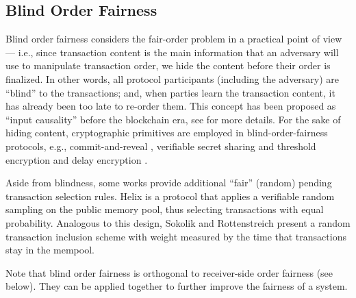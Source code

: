 \subsection{Blind Order Fairness}

Blind order fairness \cite{TOPLAS:ReiBir94,C:CKPS01,ICNP:ACGLRTY18,IWQOS:SokRot20,TOKENOMICS:MalSza22,AFT:CDEG23} considers the fair-order problem in a practical point of view --- i.e., since transaction content is the main information that an adversary will use to manipulate transaction order, we hide the content before their order is finalized.
%
In other words, all protocol participants (including the adversary) are ``blind'' to the transactions; and, when parties learn the transaction content, it has already been too late to re-order them.
%
This concept has been proposed as ``input causality'' before the blockchain era, see \cite{TOPLAS:ReiBir94,C:CKPS01,DSN:DuaReiZha17} for more details.
%
For the sake of hiding content, cryptographic primitives are employed in blind-order-fairness protocols, e.g., commit-and-reveal \cite{ICNP:ACGLRTY18,IWQOS:SokRot20}, verifiable secret sharing and threshold encryption \cite{TOKENOMICS:MalSza22} and delay encryption \cite{AFT:CDEG23}.

Aside from blindness, some works provide additional ``fair'' (random) pending transaction selection rules.
%
\textsf{Helix} \cite{ICNP:ACGLRTY18} is a protocol that applies a verifiable random sampling on the public memory pool, thus selecting transactions with equal probability.
%
Analogous to this design, Sokolik and Rottenstreich \cite{IWQOS:SokRot20} present a random transaction inclusion scheme with weight measured by the time that transactions stay in the mempool.

Note that blind order fairness is orthogonal to receiver-side order fairness (see below).
%
They can be applied together to further improve the fairness of a system.
